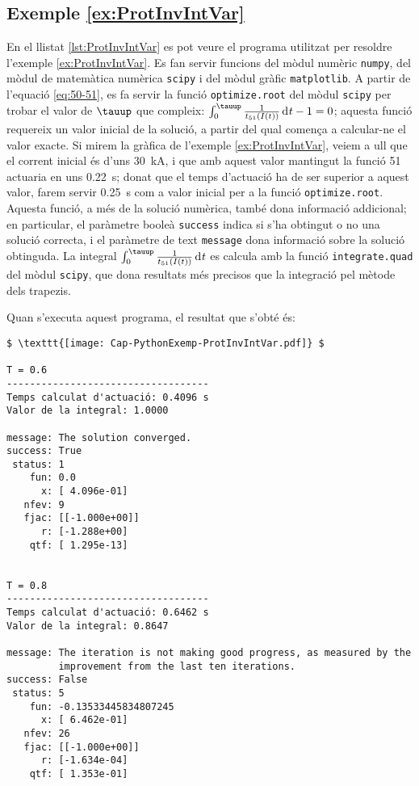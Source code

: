 \hypertarget{exemple:ProtInvIntVar}{\subsection{Exemple \ref*{ex:ProtInvIntVar} \ProtInvIntVar}}
En el llistat \vref{lst:ProtInvIntVar} es pot veure el programa utilitzat per resoldre l'exemple \vref{ex:ProtInvIntVar}. Es fan servir funcions  del mòdul numèric \texttt{numpy}, del mòdul de matemàtica numèrica \texttt{scipy} i del mòdul gràfic \texttt{matplotlib}. A partir de l'equació \eqref{eq:50-51}, es fa servir la funció  \texttt{optimize.root} del mòdul \texttt{scipy} per trobar el valor de $\tauup$ que compleix: $\int_0^\tauup \frac{1}{t_{51}(I(t))}  \diff t - 1 = 0$; aquesta  funció requereix un valor inicial de la solució, a partir del qual comença a calcular-ne el valor exacte. Si mirem la gràfica de l'exemple \ref{ex:ProtInvIntVar}, veiem a ull que el corrent inicial és d'uns \qty{30}{kA}, i que amb aquest valor mantingut la funció 51 actuaria en uns \qty{0,22}{s}; donat que el temps d'actuació ha de ser superior a aquest valor, farem servir \qty{0,25}{s} com a valor inicial per a la funció \texttt{optimize.root}. Aquesta funció, a més de la solució numèrica, també  dona informació addicional; en particular, el paràmetre booleà \texttt{success} indica si s'ha obtingut o no una solució correcta, i el  paràmetre de text \texttt{message}  dona informació sobre la solució obtinguda. La integral $\int_0^\tauup \frac{1}{t_{51}(I(t))}  \diff t$ es calcula amb la funció \texttt{integrate.quad} del mòdul \texttt{scipy}, que dona resultats més precisos que la integració pel mètode dels trapezis. 


Quan s'executa aquest programa, el resultat que s'obté és:
\lstset{
	language=,
	numbers=none,
	frame=none
}
\begin{lstlisting}[mathescape=true]
$ \texttt{[image: Cap-PythonExemp-ProtInvIntVar.pdf]} $

T = 0.6
-----------------------------------
Temps calculat d'actuació: 0.4096 s
Valor de la integral: 1.0000

message: The solution converged.
success: True
 status: 1
    fun: 0.0
      x: [ 4.096e-01]
   nfev: 9
   fjac: [[-1.000e+00]]
      r: [-1.288e+00]
    qtf: [ 1.295e-13]


T = 0.8
-----------------------------------
Temps calculat d'actuació: 0.6462 s
Valor de la integral: 0.8647

message: The iteration is not making good progress, as measured by the 
         improvement from the last ten iterations.
success: False
 status: 5
    fun: -0.13533445834807245
      x: [ 6.462e-01]
   nfev: 26
   fjac: [[-1.000e+00]]
      r: [-1.634e-04]
    qtf: [ 1.353e-01]
\end{lstlisting}


